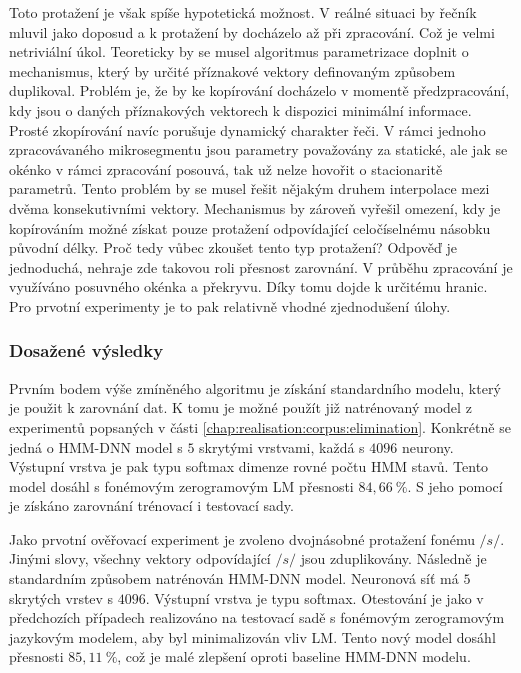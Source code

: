 Toto protažení je však spíše hypotetická možnost. V reálné situaci by řečník mluvil jako doposud a k protažení by docházelo až při zpracování. Což je velmi netriviální úkol. Teoreticky by se musel algoritmus parametrizace doplnit o mechanismus, který by určité příznakové vektory definovaným způsobem duplikoval. Problém je, že by ke kopírování docházelo v momentě předzpracování, kdy jsou o daných příznakových vektorech k dispozici minimální informace. Prosté zkopírování navíc porušuje dynamický charakter řeči. V rámci jednoho zpracovávaného mikrosegmentu jsou parametry považovány za statické, ale jak se okénko v rámci zpracování posouvá, tak už nelze hovořit o stacionaritě parametrů. Tento problém by se musel řešit nějakým druhem interpolace mezi dvěma konsekutivními vektory. Mechanismus by zároveň vyřešil omezení, kdy je kopírováním možné získat pouze protažení odpovídající celočíselnému násobku původní délky. Proč tedy vůbec zkoušet tento typ protažení? Odpověď je jednoduchá, nehraje zde takovou roli přesnost zarovnání. V průběhu zpracování je využíváno posuvného okénka a překryvu. Díky tomu dojde k určitému  hranic. Pro prvotní experimenty je to pak relativně vhodné zjednodušení úlohy.

\subsubsection{Dosažené výsledky}

Prvním bodem výše zmíněného algoritmu je získání standardního modelu, který je použit k zarovnání dat. K tomu je možné použít již natrénovaný model z experimentů popsaných v části \ref{chap:realisation:corpus:elimination}. Konkrétně se jedná o HMM-DNN model s $5$ skrytými vrstvami, každá s $4096$ neurony. Výstupní vrstva je pak typu softmax dimenze rovné počtu HMM stavů. Tento model dosáhl s fonémovým zerogramovým LM přesnosti $84,66\ \%$. S jeho pomocí je získáno zarovnání trénovací i testovací sady.

Jako prvotní ověřovací experiment je zvoleno dvojnásobné protažení fonému $/s/$. Jinými slovy, všechny vektory odpovídající $/s/$ jsou zduplikovány. Následně je standardním způsobem natrénován HMM-DNN model. Neuronová síť má $5$ skrytých vrstev s $4096$. Výstupní vrstva je typu softmax. Otestování je jako v předchozích případech realizováno na testovací sadě s fonémovým zerogramovým jazykovým modelem, aby byl minimalizován vliv LM. Tento nový model dosáhl přesnosti $85,11\ \%$, což je malé zlepšení oproti baseline HMM-DNN modelu.

